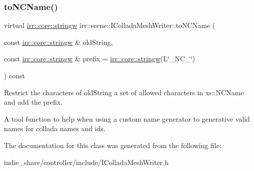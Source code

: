 \subsubsection{\texorpdfstring{to\+N\+C\+Name()}{toNCName()}}
{\footnotesize\ttfamily virtual \hyperlink{namespaceirr_1_1core_aef83fafbb1b36fcce44c07c9be23a7f2}{irr\+::core\+::stringw} irr\+::scene\+::\+I\+Collada\+Mesh\+Writer\+::to\+N\+C\+Name (\begin{DoxyParamCaption}\item[{const \hyperlink{namespaceirr_1_1core_aef83fafbb1b36fcce44c07c9be23a7f2}{irr\+::core\+::stringw} \&}]{old\+String,  }\item[{const \hyperlink{namespaceirr_1_1core_aef83fafbb1b36fcce44c07c9be23a7f2}{irr\+::core\+::stringw} \&}]{prefix = {\ttfamily \hyperlink{namespaceirr_1_1core_aef83fafbb1b36fcce44c07c9be23a7f2}{irr\+::core\+::stringw}(L\char`\"{}\+\_\+NC\+\_\+\char`\"{})} }\end{DoxyParamCaption}) const\hspace{0.3cm}{\ttfamily [pure virtual]}}



Restrict the characters of old\+String a set of allowed characters in xs\+::\+N\+C\+Name and add the prefix. 

A tool function to help when using a custom name generator to generative valid names for collada names and id\textquotesingle{}s. 

The documentation for this class was generated from the following file\+:\begin{DoxyCompactItemize}
\item 
indie\+\_\+share/controller/include/I\+Collada\+Mesh\+Writer.\+h\end{DoxyCompactItemize}
